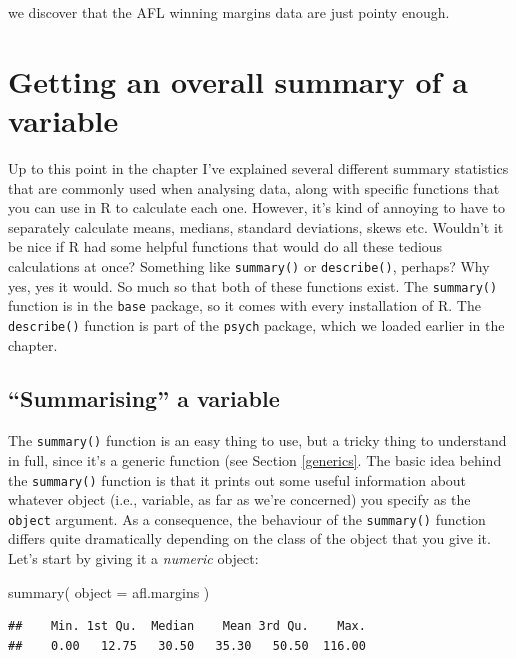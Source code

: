 \documentclass[
]{book}
\newenvironment{Shaded}{\begin{snugshade}}{\end{snugshade}}
\newcommand{\AttributeTok}[1]{\textcolor[rgb]{0.77,0.63,0.00}{#1}}
\newcommand{\FunctionTok}[1]{\textcolor[rgb]{0.00,0.00,0.00}{#1}}
\newcommand{\NormalTok}[1]{#1}
\begin{document}
we discover that the AFL winning margins data are just pointy enough.

\hypertarget{descriptive-summary}{%
\section{Getting an overall summary of a variable}\label{descriptive-summary}}

Up to this point in the chapter I've explained several different summary statistics that are commonly used when analysing data, along with specific functions that you can use in R to calculate each one. However, it's kind of annoying to have to separately calculate means, medians, standard deviations, skews etc. Wouldn't it be nice if R had some helpful functions that would do all these tedious calculations at once? Something like \texttt{summary()} or \texttt{describe()}, perhaps? Why yes, yes it would. So much so that both of these functions exist. The \texttt{summary()} function is in the \texttt{base} package, so it comes with every installation of R. The \texttt{describe()} function is part of the \texttt{psych} package, which we loaded earlier in the chapter.

\hypertarget{summarising-a-variable}{%
\subsection{``Summarising'' a variable}\label{summarising-a-variable}}

The \texttt{summary()} function is an easy thing to use, but a tricky thing to understand in full, since it's a generic function (see Section \ref{generics}. The basic idea behind the \texttt{summary()} function is that it prints out some useful information about whatever object (i.e., variable, as far as we're concerned) you specify as the \texttt{object} argument. As a consequence, the behaviour of the \texttt{summary()} function differs quite dramatically depending on the class of the object that you give it. Let's start by giving it a \emph{numeric} object:

\begin{Shaded}
\begin{Highlighting}[]
\FunctionTok{summary}\NormalTok{( }\AttributeTok{object =}\NormalTok{ afl.margins )  }
\end{Highlighting}
\end{Shaded}

\begin{verbatim}
##    Min. 1st Qu.  Median    Mean 3rd Qu.    Max. 
##    0.00   12.75   30.50   35.30   50.50  116.00
\end{verbatim}
\end{document}
